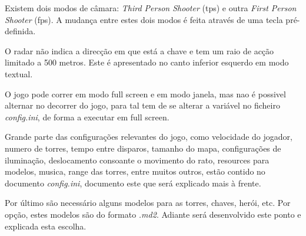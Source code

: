 % 

Existem dois modos de câmara: \textit{Third Person Shooter} (tps) e outra \textit{First Person Shooter} (fps). A mudança entre estes dois modos é feita através de uma tecla pré-definida.

O radar não indica a direcção em que está a chave e tem um raio de acção limitado a 500 metros. Este é apresentado no canto inferior esquerdo em modo textual.

O jogo pode correr em modo full screen e em modo janela, mas nao é possivel alternar no decorrer do jogo, para tal tem de se alterar a variável no ficheiro \textit{config.ini}, de forma a executar em full screen.

Grande parte das configurações relevantes do jogo, como velocidade do jogador, numero de torres, tempo entre disparos, tamanho do mapa, configurações de iluminação, deslocamento consoante o movimento do rato, resources para modelos, musica, range das torres, entre muitos outros, estão contido no documento \textit{config.ini}, documento este que será explicado mais à frente.

Por último são necessário alguns modelos para as torres, chaves, herói, etc. Por opção, estes modelos são do formato \textit{.md2}. Adiante será desenvolvido este ponto e explicada esta escolha.
